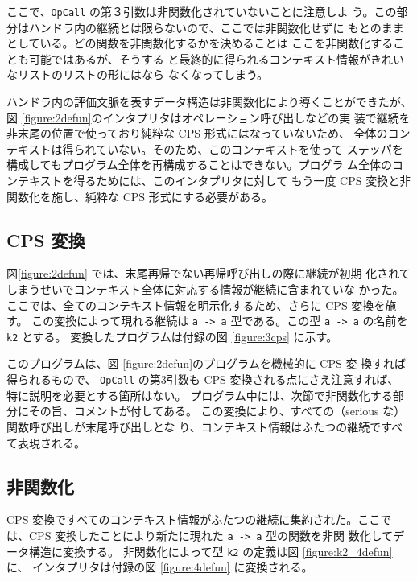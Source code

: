 ここで、\texttt{OpCall} の第３引数は非関数化されていないことに注意しよ
う。この部分はハンドラ内の継続とは限らないので、ここでは非関数化せずに
もとのままとしている。どの関数を非関数化するかを決めることは
ここを非関数化することも可能ではあるが、そうする
と最終的に得られるコンテキスト情報がきれいなリストのリストの形にはなら
なくなってしまう。

ハンドラ内の評価文脈を表すデータ構造は非関数化により導くことができたが、
図 \ref{figure:2defun}のインタプリタはオペレーション呼び出しなどの実
装で継続を非末尾の位置で使っており純粋な CPS 形式にはなっていないため、
全体のコンテキストは得られていない。そのため、このコンテキストを使って
ステッパを構成してもプログラム全体を再構成することはできない。プログラ
ム全体のコンテキストを得るためには、このインタプリタに対して
もう一度 CPS 変換と非関数化を施し、純粋な CPS 形式にする必要がある。

\subsection{CPS 変換}
\label{subsection:3cps}

図\ref{figure:2defun} では、末尾再帰でない再帰呼び出しの際に継続が初期
化されてしまうせいでコンテキスト全体に対応する情報が継続に含まれていな
かった。
ここでは、全てのコンテキスト情報を明示化するため、さらに CPS 変換を施
す。
この変換によって現れる継続は \texttt{a -> a} 型である。この型
\texttt{a -> a} の名前を \texttt{k2} とする。
変換したプログラムは付録の図 \ref{figure:3cps} に示す。

このプログラムは、図 \ref{figure:2defun}のプログラムを機械的に CPS 変
換すれば得られるもので、
\texttt{OpCall} の第3引数も CPS 変換される点にさえ注意すれば、
特に説明を必要とする箇所はない。
プログラム中には、次節で非関数化する部分にその旨、コメントが付してある。
この変換により、すべての（serious な）関数呼び出しが末尾呼び出しとな
り、コンテキスト情報はふたつの継続ですべて表現される。

\subsection{非関数化}
\label{subsection:4defun}

CPS 変換ですべてのコンテキスト情報がふたつの継続に集約された。ここで
は、CPS 変換したことにより新たに現れた \texttt{a -> a} 型の関数を非関
数化してデータ構造に変換する。
非関数化によって型 \texttt{k2} の定義は図 \ref{figure:k2_4defun} に、
インタプリタは付録の図 \ref{figure:4defun} に変換される。

